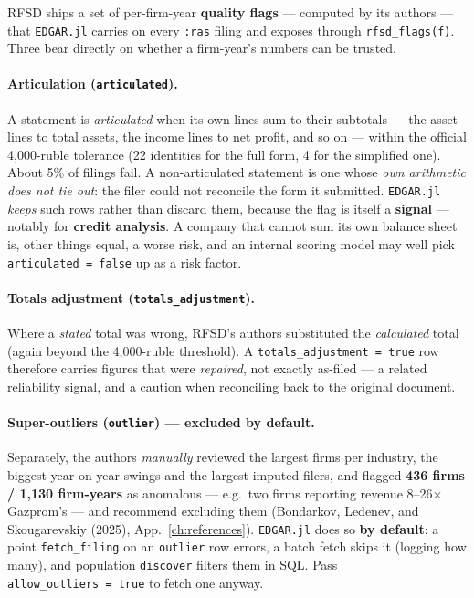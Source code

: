 \documentclass[11pt,a4paper]{report}
\begin{document}
RFSD ships a set of per-firm-year \textbf{quality flags} --- computed by its authors --- that
\texttt{EDGAR.jl} carries on every \texttt{:ras} filing and exposes through \texttt{rfsd\_flags(f)}. Three
bear directly on whether a firm-year's numbers can be trusted.

\paragraph{Articulation (\texttt{articulated}).} A statement is \emph{articulated} when its own lines sum to
their subtotals --- the asset lines to total assets, the income lines to net profit, and so on --- within
the official 4{,}000-ruble tolerance (22 identities for the full form, 4 for the simplified one). About 5\%
of filings fail. A non-articulated statement is one whose \emph{own arithmetic does not tie out}: the filer
could not reconcile the form it submitted. \texttt{EDGAR.jl} \emph{keeps} such rows rather than discard
them, because the flag is itself a \textbf{signal} --- notably for \textbf{credit analysis}. A company that
cannot sum its own balance sheet is, other things equal, a worse risk, and an internal scoring model may
well pick \texttt{articulated~=~false} up as a risk factor.

\paragraph{Totals adjustment (\texttt{totals\_adjustment}).} Where a \emph{stated} total was wrong, RFSD's
authors substituted the \emph{calculated} total (again beyond the 4{,}000-ruble threshold). A
\texttt{totals\_adjustment~=~true} row therefore carries figures that were \emph{repaired}, not exactly
as-filed --- a related reliability signal, and a caution when reconciling back to the original document.

\paragraph{Super-outliers (\texttt{outlier}) --- excluded by default.} Separately, the authors
\emph{manually} reviewed the largest firms per industry, the biggest year-on-year swings and the largest
imputed filers, and flagged \textbf{436 firms / 1{,}130 firm-years} as anomalous --- e.g.\ two firms
reporting revenue 8--26$\times$ Gazprom's --- and recommend excluding them (Bondarkov, Ledenev, and
Skougarevskiy (2025), App.~\ref{ch:references}). \texttt{EDGAR.jl} does so \textbf{by default}: a point
\texttt{fetch\_filing} on an \texttt{outlier} row errors, a batch fetch skips it (logging how many), and
population \texttt{discover} filters them in SQL. Pass \texttt{allow\_outliers~=~true} to fetch one anyway.
\end{document}
